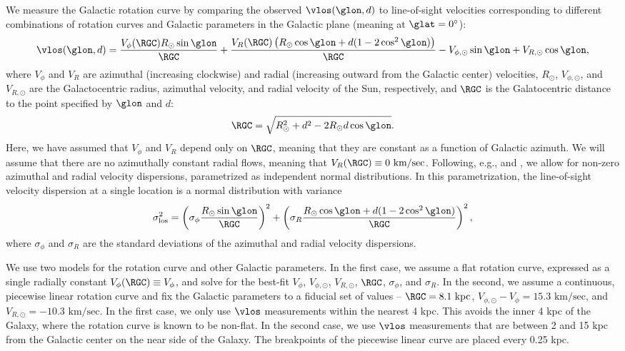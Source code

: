 We measure the Galactic rotation curve by comparing the observed $\vlos(\glon, d)$ to line-of-sight velocities corresponding to different combinations of rotation curves and Galactic parameters in the Galactic plane (meaning at $\glat=0^\circ$): 
\begin{equation}
\label{eqn:vlos_mean}
\vlos(\glon, d) = \frac{V_\phi (\RGC) R_\odot \sin\glon}{\RGC} + 
\frac{V_R (\RGC) \left(R_\odot \cos \glon + d (1 - 2 \cos^2 \glon)  \right) }{\RGC} - V_{\phi, \odot} \sin \glon + V_{R, \odot} \cos \glon,
\end{equation}
where $V_\phi$ and $V_R$ are azimuthal (increasing clockwise) and radial (increasing outward from the Galactic center) velocities, $R_\odot$, $V_{\phi, \odot}$, and $V_{R, \odot}$ are the Galactocentric radius, azimuthal velocity, and radial velocity of the Sun, respectively, and $\RGC$ is the Galatocentric distance to the point specified by $\glon$ and $d$:
\begin{equation}
\RGC = \sqrt{R^2_\odot + d^2 - 2 R_\odot d \cos \glon}.
\end{equation}
Here, we have assumed that $V_\phi$ and $V_R$ depend only on $\RGC$, meaning that they are constant as a function of Galactic azimuth.
We will assume that there are no azimuthally constant radial flows, meaning that $V_R(\RGC) \equiv 0\text{ km/sec}$.
Following, e.g., \citet{Reid:2009jb} and \citet{Bovy_2009}, we allow for non-zero azimuthal and radial velocity dispersions, parametrized as independent normal distributions. 
In this parametrization, the line-of-sight velocity dispersion at a single location is a normal distribution with variance
\begin{equation}
\label{eqn:vlos_var}
\sigma^2_\mathrm{los} = \left(\sigma_\phi \frac{R_\odot \sin \glon}{\RGC} \right)^2 + 
\left(\sigma_R  \frac{R_\odot \cos \glon + d (1 - 2 \cos^2 \glon)}{\RGC} \right)^2,
\end{equation}
where $\sigma_\phi$ and $\sigma_R$ are the standard deviations of the azimuthal and radial velocity dispersions. 

We use two models for the rotation curve and other Galactic parameters. 
In the first case, we assume a flat rotation curve, expressed as a single radially constant $V_\phi(\RGC) \equiv V_\phi$, and solve for the best-fit $V_\phi$, $V_{\phi, \odot}$, $V_{R, \odot}$, $\RGC$, $\sigma_\phi$, and $\sigma_R$. 
In the second, we assume a continuous, piecewise linear rotation curve and fix the Galactic parameters to a fiducial set of values -- $\RGC = 8.1\text{ kpc}$, $V_{\phi, \odot} - V_{\phi} = 15.3 \text{ km/sec}$, and $V_{R, \odot} = - 10.3 \text{ km/sec}$. 
In the first case, we only use $\vlos$ measurements within the nearest 4 kpc.
This avoids the inner 4 kpc of the Galaxy, where the rotation curve is known to be non-flat.
In the second case, we use $\vlos$ measurements that are between 2 and 15 kpc from the Galactic center on the near side of the Galaxy. 
The breakpoints of the piecewise linear curve are placed every 0.25 kpc.

